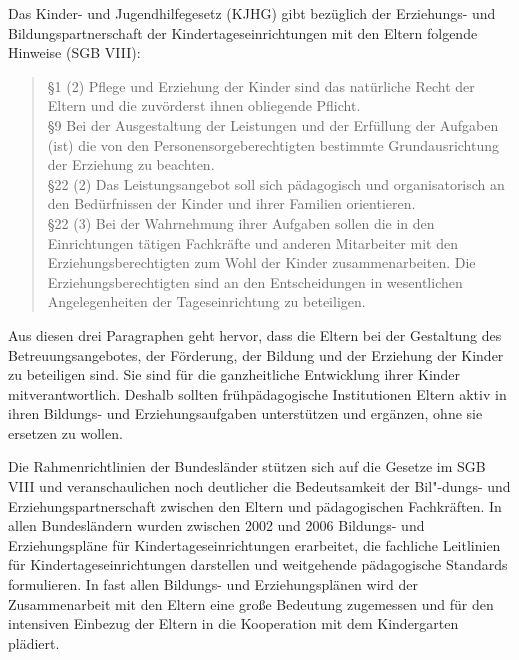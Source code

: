 \documentclass[12pt,a4paper]{article}
\begin{document}
	Das Kinder- und Jugendhilfegesetz (KJHG) gibt bezüglich der Erziehungs- und Bildungspartnerschaft der Kindertageseinrichtungen mit den Eltern folgende Hinweise (SGB VIII):
	\begin{quote}
	\begin{doublespace}
§1 (2)    Pflege und Erziehung der Kinder sind das natürliche Recht der    	     	  Eltern und die zuvörderst ihnen obliegende Pflicht. \textellipsis\\
§9     Bei der Ausgestaltung der Leistungen und der Erfüllung der    Aufgaben \textellipsis{}  (ist) \textellipsis{} die von den Personensorgeberechtigten bestimmte Grundausrichtung der  Erziehung \textellipsis{} zu beachten.\\
§22 (2)   Das Leistungsangebot soll sich pädagogisch und organisatorisch 	   an den Bedürfnissen der Kinder und ihrer Familien orientieren.\\
§22 (3)   Bei der Wahrnehmung ihrer Aufgaben sollen die in den  	   	  	  Einrichtungen tätigen Fachkräfte und anderen Mitarbeiter 	  	 mit den Erziehungsberechtigten zum Wohl der Kinder 		zusammenarbeiten. Die Erziehungsberechtigten sind an den 	Entscheidungen in wesentlichen Angelegenheiten der Tageseinrichtung zu beteiligen.
\end{doublespace}
\end{quote}
Aus diesen drei Paragraphen geht hervor, dass die Eltern bei der Gestaltung des Betreuungsangebotes, der Förderung, der Bildung und der Erziehung der Kinder zu beteiligen sind. Sie sind für die ganzheitliche Entwicklung ihrer Kinder mitverantwortlich. Deshalb sollten frühpädagogische Institutionen Eltern aktiv in ihren Bildungs- und Erziehungsaufgaben unterstützen und ergänzen, ohne sie ersetzen zu wollen.

	Die Rahmenrichtlinien der Bundesländer stützen sich auf die Gesetze im SGB VIII und veranschaulichen noch deutlicher die Bedeutsamkeit der Bil"-dungs- und Erziehungspartnerschaft zwischen den Eltern und pädagogischen Fachkräften. In allen Bundesländern wurden zwischen 2002 und 2006 Bildungs- und Erziehungspläne für Kindertageseinrichtungen erarbeitet, die fachliche Leitlinien für Kindertageseinrichtungen darstellen und weitgehende pädagogische Standards formulieren. In fast allen Bildungs- und Erziehungsplänen wird der Zusammenarbeit mit den Eltern eine große Bedeutung zugemessen und für den intensiven Einbezug der Eltern in die Kooperation mit dem Kindergarten plädiert.
	
\end{document}
